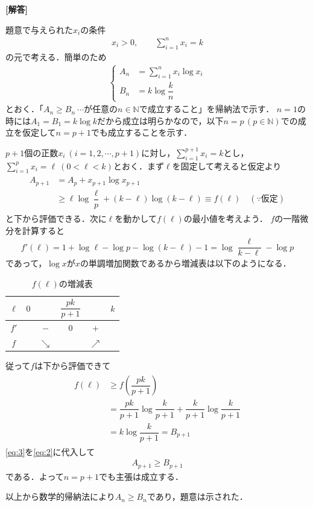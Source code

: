 \documentclass[../../main.tex]{subfiles}
\begin{document}
\begin{oframed}
  
\end{oframed}

{\bf [解答]}

題意で与えられた$x_i$の条件
\begin{align}
  x_i>0, \qquad \sum_{i=1}^nx_i=k \label{eq:1}
\end{align}
の元で考える．簡単のため
\begin{align}
  \begin{cases}
    A_n&=\displaystyle\sum_{i=1}^nx_i\log x_i \\
    B_n&=k\log\dfrac{k}{n}
  \end{cases}
\end{align}
とおく．「$A_n\ge B_n\ \cdots$が任意の$n\in\mathbb{N}$で成立すること」を帰納法で示す．
$n=1$の時には$A_1=B_1=k\log k$だから成立は明らかなので，以下$n=p\, (p\in\mathbb{N})$での成立を仮定して$n=p+1$でも成立することを示す．

$p+1$個の正数$x_i\ (i=1,2,\cdots,p+1)$に対し，$\displaystyle\sum_{i=1}^{p+1}x_i=k$とし，$\displaystyle\sum_{i=1}^px_i=\ell\ (0<\ell<k)$とおく．まず$\ell$を固定して考えると仮定より
\begin{align}
  \begin{split}
    A_{p+1}
    &=A_p+x_{p+1}\log x_{p+1} \\
    &\ge\ell\log\dfrac{\ell}{p}+(k-\ell)\log(k-\ell)\equiv f(\ell) \quad(\because\text{仮定}) \label{eq:2}
  \end{split}
\end{align}
と下から評価できる．次に$\ell$を動かして$f(\ell)$の最小値を考えよう．
$f$の一階微分を計算すると
\begin{align}
  f'(\ell)=1+\log\ell-\log p-\log(k-\ell)-1=\log\dfrac{\ell}{k-\ell}-\log p
\end{align}
であって，$\log x$が$x$の単調増加関数であるから増減表は以下のようになる．
\begin{table}[htb]
  \centering
  \caption{$f(\ell)$の増減表}
  \begin{tabular}{c|ccccc}
    $\ell$ & $0$ & & $\dfrac{pk}{p+1}$ & & $k$ \\
    \hline
    $f'$ & & $-$ & $0$ & $+$ & \\
    \hline
    $f$ & & $\searrow$ & & $\nearrow$ &
  \end{tabular}
\end{table}

従って$f$は下から評価できて
\begin{align}
  \begin{split}
    f(\ell)
    &\ge f\left(\dfrac{pk}{p+1}\right) \\
    & = \dfrac{pk}{p+1}\log\dfrac{k}{p+1}+\dfrac{k}{p+1}\log\dfrac{k}{p+1} \\
    & = k\log\dfrac{k}{p+1}=B_{p+1} \label{eq:3}
  \end{split}
\end{align}
\cref{eq:3}を\cref{eq:2}に代入して
\begin{align}
  A_{p+1} \ge B_{p+1}
\end{align}
である．よって$n=p+1$でも主張は成立する．

以上から数学的帰納法により$A_n \ge B_n$であり，題意は示された．

\newpage
\end{document}
